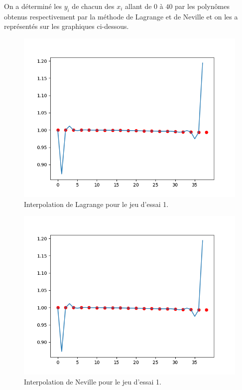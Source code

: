 \documentclass[12pt,french,titlepage]{article}
\begin{document}
		On a déterminé les $y_i$ de chacun des $x_i$ allant de $0$ à $40$ par les polynômes obtenus respectivement par la méthode de Lagrange et de Neville et on les a représentés sur les graphiques ci-dessous.\\
		\begin{figure}[H]
		\includegraphics[width=\textwidth]{"11.png"}
		\caption{Interpolation de Lagrange pour le jeu d'essai 1.}
		\end{figure}
		
		\begin{figure}[H]
		\includegraphics[width=\textwidth]{"12.png"}
		\caption{Interpolation de Neville pour le jeu d'essai 1.}
		\end{figure}
	
\end{document}
